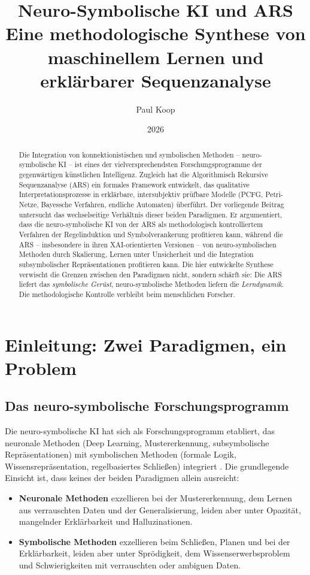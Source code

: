 \documentclass[12pt,a4paper]{article}
\title{\Huge\textbf{Neuro-Symbolische KI und ARS} \\
       \LARGE Eine methodologische Synthese von\\
       \LARGE maschinellem Lernen und erklärbarer Sequenzanalyse}
\author{
  \large
  \begin{tabular}{c}
    Paul Koop
  \end{tabular}
}
\date{\large 2026}
\begin{document}
\maketitle

\begin{abstract}
Die Integration von konnektionistischen und symbolischen Methoden – neuro-symbolische 
KI – ist eines der vielversprechendsten Forschungsprogramme der gegenwärtigen 
künstlichen Intelligenz. Zugleich hat die Algorithmisch Rekursive Sequenzanalyse 
(ARS) ein formales Framework entwickelt, das qualitative Interpretationsprozesse 
in erklärbare, intersubjektiv prüfbare Modelle (PCFG, Petri-Netze, Bayessche 
Verfahren, endliche Automaten) überführt. Der vorliegende Beitrag untersucht das 
wechselseitige Verhältnis dieser beiden Paradigmen. Er argumentiert, dass die 
neuro-symbolische KI von der ARS als methodologisch kontrolliertem Verfahren der 
Regelinduktion und Symbolverankerung profitieren kann, während die ARS – insbesondere 
in ihren XAI-orientierten Versionen – von neuro-symbolischen Methoden durch Skalierung, 
Lernen unter Unsicherheit und die Integration subsymbolischer Repräsentationen 
profitieren kann. Die hier entwickelte Synthese verwischt die Grenzen zwischen den 
Paradigmen nicht, sondern schärft sie: Die ARS liefert das \textit{symbolische 
Gerüst}, neuro-symbolische Methoden liefern die \textit{Lerndynamik}. Die 
methodologische Kontrolle verbleibt beim menschlichen Forscher.
\end{abstract}

\newpage
\tableofcontents
\newpage

\section{Einleitung: Zwei Paradigmen, ein Problem}

\subsection{Das neuro-symbolische Forschungsprogramm}

Die neuro-symbolische KI hat sich als Forschungsprogramm etabliert, das neuronale 
Methoden (Deep Learning, Mustererkennung, subsymbolische Repräsentationen) mit 
symbolischen Methoden (formale Logik, Wissensrepräsentation, regelbasiertes 
Schließen) integriert \citep{hitzler2022neuro, garcez2020neurosymbolic}. Die 
grundlegende Einsicht ist, dass keines der beiden Paradigmen allein ausreicht:

\begin{itemize}
    \item \textbf{Neuronale Methoden} exzellieren bei der Mustererkennung, dem 
    Lernen aus verrauschten Daten und der Generalisierung, leiden aber unter 
    Opazität, mangelnder Erklärbarkeit und Halluzinationen.
    
    \item \textbf{Symbolische Methoden} exzellieren beim Schließen, Planen und 
    bei der Erklärbarkeit, leiden aber unter Sprödigkeit, dem Wissenserwerbsproblem 
    und Schwierigkeiten mit verrauschten oder ambiguen Daten.
\end{itemize}
\end{document}
